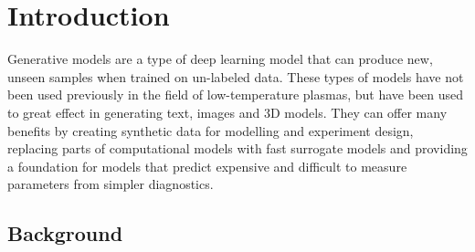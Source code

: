 \documentclass[10pt]{iopart}
\begin{document}
%
\maketitle
% 
\ioptwocol

\section{Introduction}\label{sec:intro}

Generative models are a type of deep learning model that can produce new, unseen samples when trained on un-labeled data. These types of models have not been used previously in the field of low-temperature plasmas, but have been used to great effect in generating text, images and 3D models. They can offer many benefits by creating synthetic data for modelling and experiment design, replacing parts of computational models with fast surrogate models and providing a foundation for models that predict expensive and difficult to measure parameters from simpler diagnostics.




\subsection{Background}
\end{document}
